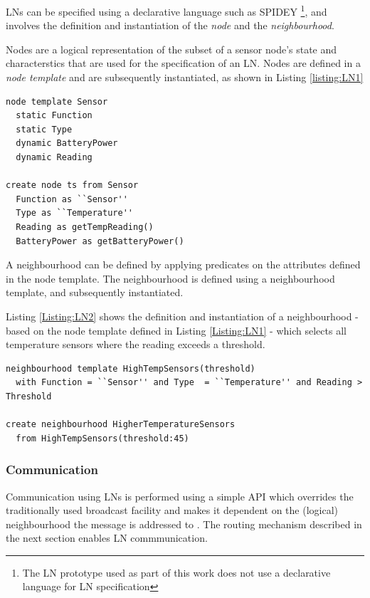 LNs can be specified using a declarative language such as SPIDEY
\cite{mottola_LN:2006, mottola_LNScoping:2006}\footnote{The LN prototype used as
part of this work does not use a declarative language for LN specification}, and
involves the definition and instantiation of the \emph{node} and the
\emph{neighbourhood}. 

Nodes are a logical representation of the subset of a sensor node's state and
characterstics that are used for the specification of an LN. Nodes are defined
in a \emph{node template} and are subsequently instantiated, as shown in Listing \ref{listing:LN1}
   
\begin{lstlisting}[frame=trbl, basewidth={0.55em, 0.6em}, captionpos=b, 
basicstyle=\ttfamily\footnotesize, breaklines, caption = Node Definition and Instantiation, label = listing:LN1 ]  
node template Sensor
  static Function
  static Type
  dynamic BatteryPower
  dynamic Reading

create node ts from Sensor
  Function as ``Sensor''
  Type as ``Temperature''
  Reading as getTempReading()
  BatteryPower as getBatteryPower()
\end{lstlisting}

A neighbourhood can be defined by applying predicates on the attributes defined
in the
node template. The neighbourhood is defined using a neighbourhood
template, and subsequently instantiated. 

Listing \ref{Listing:LN2} shows the definition and
instantiation of a
neighbourhood - based on the node template defined in Listing \ref{Listing:LN1}
- which selects all temperature sensors where the reading exceeds a threshold.
 
\begin{lstlisting}[frame=trbl, basewidth={0.55em, 0.6em}, captionpos=b, 
basicstyle=\ttfamily\footnotesize, breaklines, caption = Neighbourhood Definition and Instantiation, label = listing:LN2 ]  
neighbourhood template HighTempSensors(threshold)
  with Function = ``Sensor'' and Type  = ``Temperature'' and Reading > Threshold

create neighbourhood HigherTemperatureSensors
  from HighTempSensors(threshold:45)
\end{lstlisting}

\subsubsection{Communication}

Communication using LNs is performed using a simple API which overrides the
traditionally used broadcast facility and makes it dependent on the (logical)
neighbourhood the message is addressed to \cite{mottola_LN:2006}. The routing mechanism described in
the next section enables LN commmunication.

